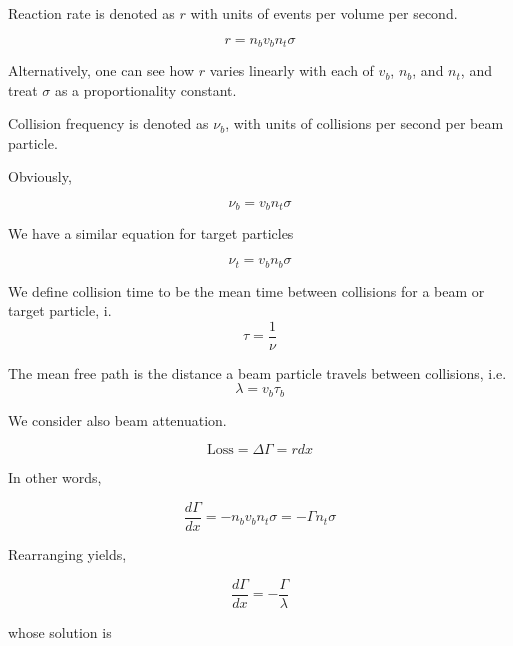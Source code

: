 \documentclass[12pt]{article}
\begin{document}
\begin{defn}
    Reaction rate is denoted as $r$ with units of events per volume per second.
\end{defn}

\begin{equation}
    r = n_bv_bn_t\sigma
\end{equation}

Alternatively, one can see how $r$ varies linearly with each of $v_b$, $n_b$, and $n_t$, and  treat $\sigma$ as a proportionality constant.

\begin{defn}
    Collision frequency is denoted as $\nu_b$, with units of collisions per second per beam particle.
\end{defn}

Obviously,

\begin{equation}
    \nu_b = v_bn_t\sigma
\end{equation}

We have a similar equation for target particles

\begin{equation}
    \nu_t = v_bn_b\sigma
\end{equation}

\begin{defn}
    We define collision time to be the mean time between collisions for a beam or target particle, i.
    \begin{equation}
        \tau = \frac{1}{\nu}
    \end{equation}
\end{defn}

\begin{defn}
    The mean free path is the distance a beam particle travels between collisions, i.e.
    \begin{equation}
        \lambda = v_b\tau_b
    \end{equation}
\end{defn}

We consider also beam attenuation.

$$\text{Loss} = \Delta\Gamma = rdx$$

In other words,

$$\frac{d\Gamma}{dx} = -n_bv_bn_t\sigma = -\Gamma n_t\sigma$$

Rearranging yields,

$$\frac{d\Gamma}{dx} = -\frac{\Gamma}{\lambda}$$

whose solution is
\end{document}
